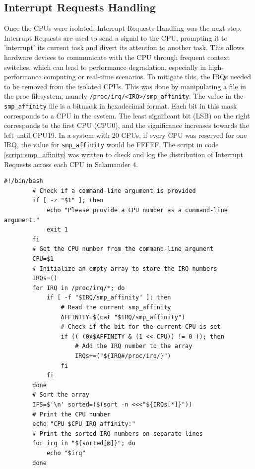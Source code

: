 \documentclass[MMR,Master,english]{twbook}
\begin{document}
\subsection{Interrupt Requests Handling}\label{sec:irq_handling}
Once the CPUs were isolated, Interrupt Requests Handling was the next step. Interrupt Requests are used to send a signal to the CPU, prompting it to 'interrupt' its current task and divert its attention to another task. This allows hardware devices to communicate with the CPU through frequent context switches, which can lead to performance degradation, especially in high-performance computing or real-time scenarios. To mitigate this, the IRQs needed to be removed from the isolated CPUs. This was done by manipulating a file in the proc filesystem, namely \texttt{/proc/irq/<IRQ>/smp\_affinity}. The value in the \texttt{smp\_affinity} file is a bitmask in hexadecimal format. Each bit in this mask corresponds to a CPU in the system. The least significant bit (LSB) on the right corresponds to the first CPU (CPU0), and the significance increases towards the left until CPU19. In a system with 20 CPUs, if every CPU was reserved for one IRQ, the value for \texttt{smp\_affinity} would be FFFFF. The script in code \ref{script:smp_affinity} was written to check and log the distribution of Interrupt Requests across each CPU in Salamander 4.

\vspace{1em}
\begin{minipage}{0.95\columnwidth}
	\begin{lstlisting}[name={Check distribution of Interrupt Requests across each CPU},label={script:smp_affinity}]
		#!/bin/bash
		# Check if a command-line argument is provided
		if [ -z "$1" ]; then
			echo "Please provide a CPU number as a command-line argument."
			exit 1
		fi
		# Get the CPU number from the command-line argument
		CPU=$1
		# Initialize an empty array to store the IRQ numbers
		IRQs=()
		for IRQ in /proc/irq/*; do
			if [ -f "$IRQ/smp_affinity" ]; then
				# Read the current smp_affinity
				AFFINITY=$(cat "$IRQ/smp_affinity")
				# Check if the bit for the current CPU is set
				if (( (0x$AFFINITY & (1 << CPU)) != 0 )); then
					# Add the IRQ number to the array
					IRQs+=("${IRQ#/proc/irq/}")
				fi
			fi
		done
		# Sort the array
		IFS=$'\n' sorted=($(sort -n <<<"${IRQs[*]}"))
		# Print the CPU number
		echo "CPU $CPU IRQ affinity:"
		# Print the sorted IRQ numbers on separate lines
		for irq in "${sorted[@]}"; do
			echo "$irq"
		done
		
\end{lstlisting}
\end{minipage}
\end{document}
